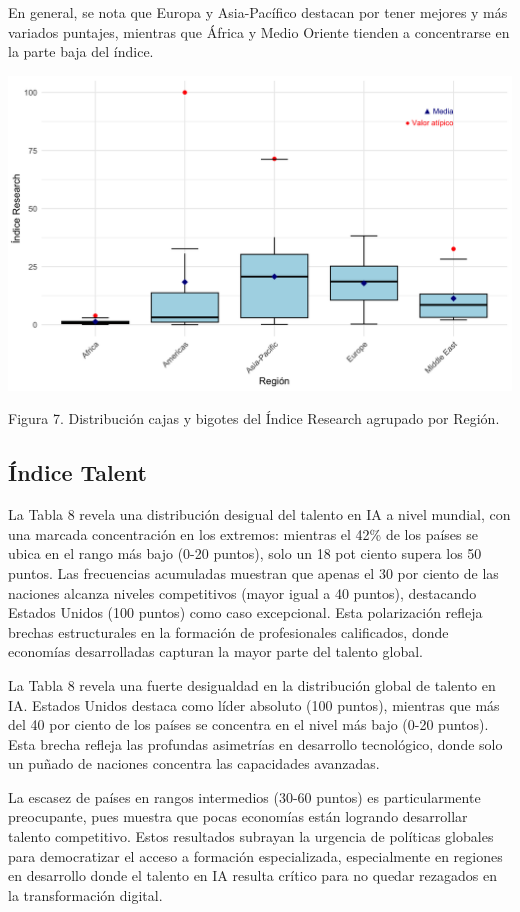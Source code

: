 \documentclass[
]{article}
\begin{document}
\begin{multicols}{2}
En general, se nota que Europa y Asia-Pacífico destacan por tener mejores y más variados puntajes, mientras que África y Medio Oriente tienden a concentrarse en la parte baja del índice.



\begin{center}
\includegraphics[width=\linewidth]{figura7.png}
\end{center}
Figura 7. Distribución cajas y bigotes del Índice Research agrupado por Región.


\subsection{Índice Talent}

La Tabla 8 revela una distribución desigual del talento en IA a nivel mundial, con una marcada concentración en los extremos: mientras el 42\% de los países se ubica en el rango más bajo (0-20 puntos), solo un 18 pot ciento supera los 50 puntos. Las frecuencias acumuladas muestran que apenas el 30 por ciento de las naciones alcanza niveles competitivos (mayor igual a 40 puntos), destacando Estados Unidos (100 puntos) como caso excepcional. Esta polarización refleja brechas estructurales en la formación de profesionales calificados, donde economías desarrolladas capturan la mayor parte del talento global.

La Tabla 8 revela una fuerte desigualdad en la distribución global de talento en IA. Estados Unidos destaca como líder absoluto (100 puntos), mientras que más del 40 por ciento de los países se concentra en el nivel más bajo (0-20 puntos). Esta brecha refleja las profundas asimetrías en desarrollo tecnológico, donde solo un puñado de naciones concentra las capacidades avanzadas.

La escasez de países en rangos intermedios (30-60 puntos) es particularmente preocupante, pues muestra que pocas economías están logrando desarrollar talento competitivo. Estos resultados subrayan la urgencia de políticas globales para democratizar el acceso a formación especializada, especialmente en regiones en desarrollo donde el talento en IA resulta crítico para no quedar rezagados en la transformación digital.

\end{multicols}
\end{document}
